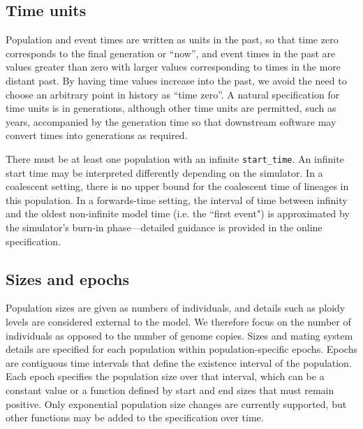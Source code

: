 \documentclass[11pt]{article}
\begin{document}
\subsection{Time units}

Population and event times are written as units in the past, so that time zero
corresponds to the final generation or ``now'', and event times in the past are
values greater than zero with larger values corresponding to times in the more
distant past. By having time values increase into the past, we avoid the need to
choose an arbitrary point in history as ``time zero''. A natural
specification for time units is in generations, although other time units are
permitted, such as years, accompanied by the generation time
so that downstream software may convert times into generations as required.

There must be at least one population with an infinite \texttt{start\_time}.
An infinite start time may be interpreted differently depending on the simulator.
In a coalescent setting, there is no upper bound for the coalescent time
of lineages in this population.
In a forwards-time setting, the interval of time between infinity and
the oldest non-infinite model time (i.e. the ``first event") is approximated
by the simulator's burn-in phase---detailed guidance
is provided in the online specification.

\subsection{Sizes and epochs}

Population sizes are given as numbers of individuals, and details
such as ploidy levels are considered external to the model.
We therefore focus on the number of individuals as opposed
to the number of genome copies.
Sizes and mating system details are specified for each population within
population-specific epochs.
Epochs are contiguous time intervals that define
the existence interval of the population. Each epoch specifies the population size
over that interval, which can be a constant value or a function defined by start
and end sizes that must remain positive.
Only exponential population size changes are currently supported,
but other functions may be added to the specification over time.
\end{document}
